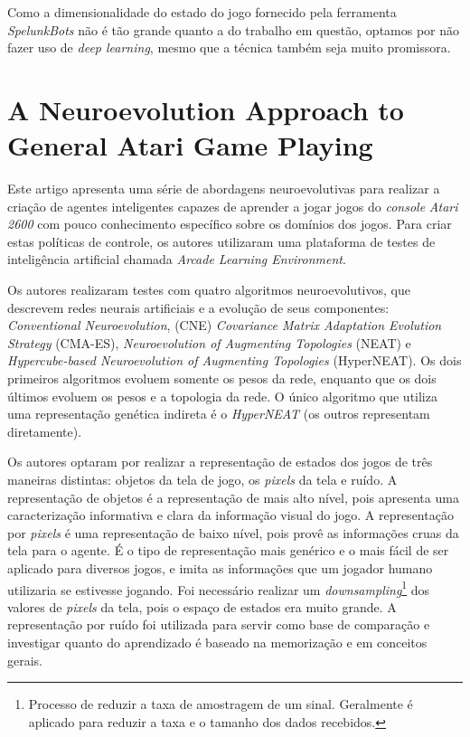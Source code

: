 Como a dimensionalidade do estado do jogo fornecido pela ferramenta
\textit{SpelunkBots} não é tão grande quanto a do trabalho em questão, optamos
por não fazer uso de \textit{deep learning}, mesmo que a técnica também seja
muito promissora.


\section{A Neuroevolution Approach to General Atari Game Playing}
Este artigo \cite{NeuroEvolutionAtari} apresenta uma série de abordagens
neuroevolutivas para realizar a criação de agentes inteligentes capazes de
aprender a jogar jogos do \textit{console} \textit{Atari 2600} com pouco
conhecimento específico sobre os domínios dos jogos. Para criar estas políticas
de controle, os autores utilizaram uma plataforma de testes de inteligência
artificial chamada \textit{Arcade Learning Environment}.

Os autores realizaram testes com quatro algoritmos neuroevolutivos, que
descrevem redes neurais artificiais e a evolução de seus componentes:
\textit{Conventional Neuroevolution}, (CNE) \textit{Covariance Matrix Adaptation
Evolution Strategy} (CMA-ES), \textit{Neuroevolution of Augmenting Topologies}
(NEAT) e \textit{Hypercube-based Neuroevolution of Augmenting Topologies}
(HyperNEAT). Os dois primeiros algoritmos evoluem somente os pesos da rede,
enquanto que os dois últimos evoluem os pesos e a topologia da rede. O único
algoritmo que utiliza uma representação genética indireta é o \textit{HyperNEAT}
(os outros representam diretamente).

Os autores optaram por realizar a representação de estados dos jogos de três
maneiras distintas: objetos da tela de jogo, os \textit{pixels} da tela e ruído.
A representação de objetos é a representação de mais alto nível, pois apresenta
uma caracterização informativa e clara da informação visual do jogo. A
representação por \textit{pixels} é uma representação de baixo nível, pois provê
as informações cruas da tela para o agente. É o tipo de representação mais
genérico e o mais fácil de ser aplicado para diversos jogos, e imita as
informações que um jogador humano utilizaria se estivesse jogando.  Foi
necessário realizar um \textit{downsampling}\footnote{Processo de reduzir a taxa
de amostragem de um sinal. Geralmente é aplicado para reduzir a taxa e o tamanho
dos dados recebidos.} dos valores de \textit{pixels} da tela, pois o espaço de
estados era muito grande. A representação por ruído foi utilizada para servir
como base de comparação e investigar quanto do aprendizado é baseado na
memorização e em conceitos gerais.

